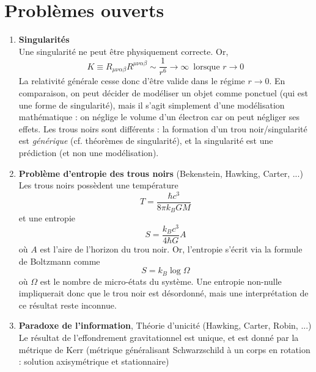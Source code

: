 \section{Problèmes ouverts}
\begin{enumerate}
    \item \textbf{Singularités}\\
    Une singularité ne peut être physiquement correcte. Or,
    \begin{equation}
        K \equiv R_{\mu\nu \alpha\beta} R^{\mu\nu\alpha\beta} \sim \frac{1}{r^6} \to \infty \, \text{ lorsque } r\to 0
    \end{equation}
    La relativité générale cesse donc d'être valide dans le régime $r\to 0$. En comparaison, on peut décider de modéliser un objet comme ponctuel (qui est une forme de singularité), mais il s'agit simplement d'une modélisation mathématique : on néglige le volume d'un électron car on peut négliger ses effets. Les trous noirs sont différents : la formation d'un trou noir/singularité est \emph{générique} (cf. théorèmes de singularité), et la singularité est une prédiction (et non une modélisation).
    \item \textbf{Problème d'entropie des trous noirs} (Bekenstein, Hawking, Carter, ...)\\
    Les trous noirs possèdent une température
    \begin{equation}
        T = \frac{\hbar c^3}{8\pi k_B GM}
    \end{equation}
    et une entropie
    \begin{equation}
        S = \frac{k_B c^3}{4 \hbar G}A
    \end{equation}
    où $A$ est l'aire de l'horizon du trou noir. Or, l'entropie s'écrit via la formule de Boltzmann comme
    \begin{equation}
        S = k_B \log \Omega
    \end{equation}
    où $\Omega$ est le nombre de micro-états du système. Une entropie non-nulle impliquerait donc que le trou noir est désordonné, mais une interprétation de ce résultat reste inconnue.\\
    \item \textbf{Paradoxe de l'information}, Théorie d'unicité (Hawking, Carter, Robin, ...)\\
    Le résultat de l'effondrement gravitationnel est unique, et est donné par la métrique de Kerr (métrique généralisant Schwarzschild à un corps en rotation : solution axisymétrique et stationnaire) 
    \begin{align*}

\end{align*}
\end{enumerate}

